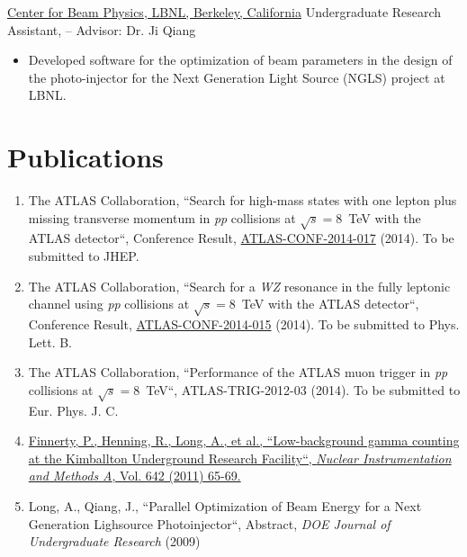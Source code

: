 \href{http://www.cbp.lbl.gov/}{{Center for Beam Physics}, LBNL, Berkeley, California} \newline
Undergraduate Research Assistant,  --  \newline
Advisor: Dr. Ji Qiang 
{\begin{itemize}
\item Developed software for the optimization of beam parameters
in the design of the photo-injector for the Next Generation Light Source (NGLS) project at LBNL.
\end{itemize}
}


\section*{Publications}

\begin{enumerate}
 0cm \linewidth \listindent \dimexpr\linewidth-\listindent\relax
\item[] The ATLAS Collaboration, ``Search for high-mass states with one lepton plus missing transverse momentum in \textit{pp} collisions 
at $\sqrt{s} = 8 $~TeV with the ATLAS detector``, Conference Result, \href{http://cds.cern.ch/record/1692660}{ATLAS-CONF-2014-017} (2014). To be submitted to JHEP.

\item[] The ATLAS Collaboration, ``Search for a \textit{WZ} resonance in the fully leptonic channel using \textit{pp} collisions at $\sqrt{s} = 8 $~TeV with the ATLAS detector``, Conference Result, \href{http://cds.cern.ch/record/1692369}{ATLAS-CONF-2014-015} (2014). To be submitted to Phys. Lett. B.

\item[] The ATLAS Collaboration, ``Performance of the ATLAS muon trigger in \textit{pp} collisions at $\sqrt{s} = 8$~TeV``, ATLAS-TRIG-2012-03 (2014). To be submitted to Eur. Phys. J. C.


\item[] \href{http://arxiv.org/abs/1007.0015}{Finnerty, P., Henning, R., Long, A., et al., ``Low-background gamma counting at the Kimballton Underground Research Facility``, \textit{Nuclear Instrumentation and Methods A}, Vol. 642 (2011) 65-69. }

\item[] Long, A., Qiang, J., ``Parallel Optimization of Beam Energy for a Next Generation Lighsource Photoinjector``, Abstract, \textit{DOE Journal of Undergraduate Research} (2009)

\end{enumerate}

